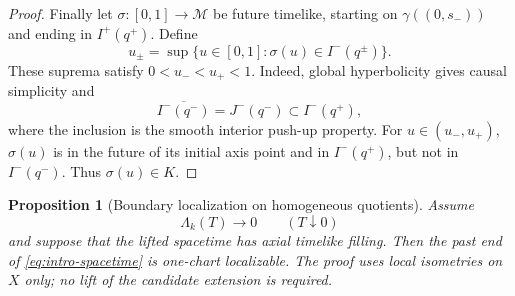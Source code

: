 \documentclass[10pt,a4paper]{article}
\numberwithin{equation}{section}
\newtheorem{proposition}[theorem]{Proposition}
\theoremstyle{definition}
\theoremstyle{remark}
\newcommand{\cM}{\mathcal M}
\begin{document}
\begin{proof}
Finally let $\sigma:[0,1]\to\cM$ be future timelike, starting on
$\gamma((0,s_-))$ and ending in $I^+(q^+)$.  Define
\[
 u_\pm=\sup\{u\in[0,1]:\sigma(u)\in I^-(q^\pm)\}.
\]
These suprema satisfy $0<u_-<u_+<1$.  Indeed, global
hyperbolicity gives causal simplicity and
\[
 \overline{I^-(q^-)}=J^-(q^-)\subset I^-(q^+),
\]
where the inclusion is the smooth interior push-up property.  For
$u\in(u_-,u_+)$, $\sigma(u)$ is in the future of its initial axis point
and in $I^-(q^+)$, but not in $I^-(q^-)$.  Thus $\sigma(u)\in K$.
\end{proof}

\begin{proposition}[Boundary localization on homogeneous quotients]
\label{thm:quotient-localization}
Assume
\begin{equation}
 \Lambda_k(T)\longrightarrow0\qquad(T\downarrow0)
 \label{eq:vanishing-length}
\end{equation}
and suppose that the lifted spacetime has axial timelike filling.  Then the
past end of \eqref{eq:intro-spacetime} is one-chart localizable.  The proof
uses local isometries on $X$ only; no lift of the candidate extension is
required.
\end{proposition}
\end{document}
